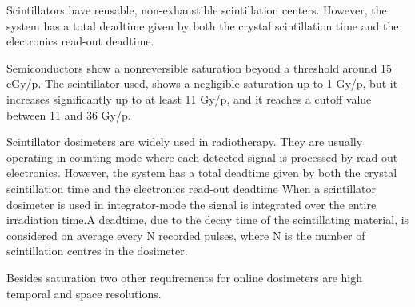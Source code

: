         Scintillators have reusable, non-exhaustible scintillation centers. However, the system has a total deadtime given by both the crystal scintillation time and the electronics read-out deadtime.

        Semiconductors show a nonreversible saturation beyond a threshold around 15 cGy/p. The scintillator used, shows a negligible saturation up to 1 Gy/p, but it increases significantly up to at least 11 Gy/p, and it reaches a cutoff value between 11 and 36 Gy/p.

        Scintillator dosimeters are widely used in radiotherapy. They are usually operating in counting-mode where each detected signal is processed by read-out electronics.
        However, the system has a total deadtime given by both the crystal scintillation time and the electronics read-out deadtime
        When a scintillator dosimeter is used in integrator-mode the signal is integrated over the entire irradiation time.A deadtime, due to the decay time of the scintillating material, is considered on average every N recorded pulses, where N is the number of scintillation centres in the dosimeter.


        Besides saturation two other requirements for online dosimeters are high temporal and space resolutions. 


    
    




